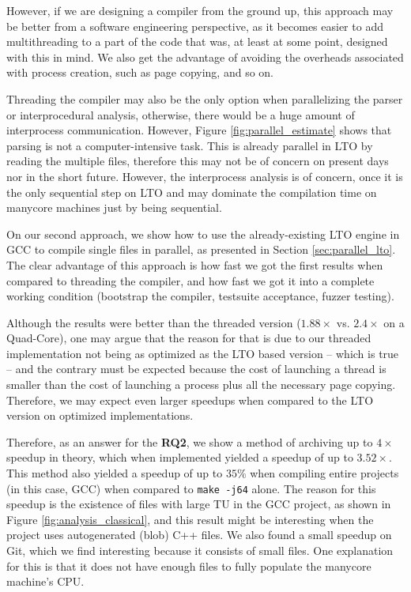 However, if we are designing a compiler from the ground up, this approach may
be better from a software engineering perspective, as it becomes easier to add
multithreading to a part of the code that was, at least at some point, designed
with this in mind. We also get the advantage of avoiding the overheads
associated with process creation, such as page copying, and so on.

Threading the compiler may also be the only option when parallelizing the
parser or interprocedural analysis, otherwise, there would be a huge amount of
interprocess communication. However, Figure \ref{fig:parallel_estimate} shows
that parsing is not a computer-intensive task. This is already parallel in LTO
by reading the multiple files, therefore this may not be of concern on present
days nor in the short future. However, the interprocess analysis is of concern,
once it is the only sequential step on LTO and may dominate the compilation
time on manycore machines just by being sequential.

On our second approach, we show how to use the already-existing LTO engine in
GCC to compile single files in parallel, as presented in Section
\ref{sec:parallel_lto}. The clear advantage of this approach is how fast we got
the first results when compared to threading the compiler, and how fast we got
it into a complete working condition (bootstrap the compiler, testsuite
acceptance, fuzzer testing).

Although the results were better than the threaded version ($1.88\times$ vs. $2.4\times$
on a Quad-Core),
one may argue that the reason for that is due to our threaded implementation
not being as optimized as the LTO based version -- which is true -- and the
contrary must be expected because the cost of launching a thread is smaller
than the cost of launching a process plus all the necessary page copying.
Therefore, we may expect even larger speedups when compared to the LTO version
on optimized implementations.

Therefore, as an answer for the \textbf{RQ2}, we show a method of archiving up
to $4\times$ speedup in theory, which when implemented yielded a speedup of up
to $3.52\times$. This method also yielded a speedup of up to $35\%$ when
compiling entire projects (in this case, GCC) when compared to \texttt{make
-j64} alone. The reason for this speedup is the existence of files with large
TU in the GCC project, as shown in Figure \ref{fig:analysis_classical}, and
this result might be interesting when the project uses autogenerated (blob) C++
files. We also found a small speedup on Git, which we find interesting because
it consists of small files. One explanation for this is that it does not have
enough files to fully populate the manycore machine's CPU.


